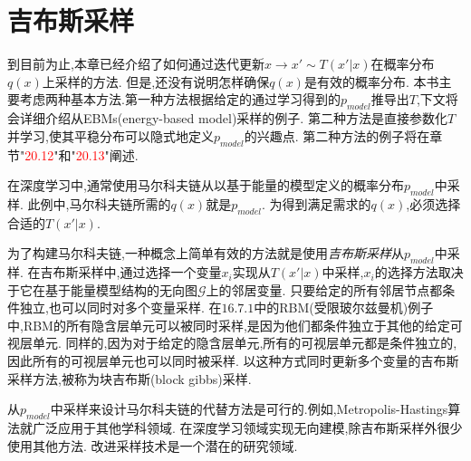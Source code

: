 \section{吉布斯采样}
\label{sec:17.4}

到目前为止,本章已经介绍了如何通过迭代更新$x\rightarrow x' \sim T (x'|x) $在概率分布$q(x)$上采样的方法.
但是,还没有说明怎样确保$q(x)$是有效的概率分布.
本书主要考虑两种基本方法.第一种方法根据给定的通过学习得到的$p_{model}$推导出$T$,下文将会详细介绍从EBMs(energy-based model)采样的例子.
第二种方法是直接参数化$T$并学习,使其平稳分布可以隐式地定义$p_{model}$的兴趣点.
第二种方法的例子将在章节"\textcolor{red}{20.12}"和"\textcolor{red}{20.13}"阐述.

在深度学习中,通常使用马尔科夫链从以基于能量的模型定义的概率分布$p_{model}$中采样.
此例中,马尔科夫链所需的$q(x)$就是$p_{model}$.
为得到满足需求的$q(x)$,必须选择合适的$T(x'|x)$.

为了构建马尔科夫链,一种概念上简单有效的方法就是使用\textit{吉布斯采样}从$p_{model}$中采样.
在吉布斯采样中,通过选择一个变量$x_i$实现从$T(x'|x)$中采样,$x_i$的选择方法取决于它在基于能量模型结构的无向图$\mathcal{G}$上的邻居变量.
只要给定的所有邻居节点都条件独立,也可以同时对多个变量采样.
在$16.7.1$中的RBM(受限玻尔兹曼机)例子中,RBM的所有隐含层单元可以被同时采样,是因为他们都条件独立于其他的给定可视层单元.
同样的,因为对于给定的隐含层单元,所有的可视层单元都是条件独立的,因此所有的可视层单元也可以同时被采样.
以这种方式同时更新多个变量的吉布斯采样方法,被称为块吉布斯(block gibbs)采样.

从$p_{model}$中采样来设计马尔科夫链的代替方法是可行的.例如,Metropolis-Hastings算法就广泛应用于其他学科领域.
在深度学习领域实现无向建模,除吉布斯采样外很少使用其他方法.
改进采样技术是一个潜在的研究领域.

